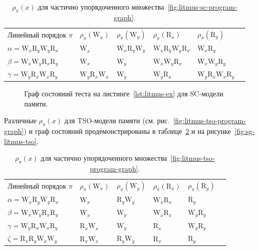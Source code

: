 \begin{table}[ht]
  \caption{$\rho_{\pi}(x)$ для частично упорядоченного
  множества~\ref{fig:litmus-sc-program-graph}.}
  \centering
  \begin{tabular}{llllll}
    Линейный порядок $\pi$ & $\rho_{\pi}(\text{W}_x)$ &
    $\rho_{\pi}(\text{W}_y)$ & $\rho_{\pi}(\text{R}_x)$ &
    $\rho_{\pi}(\text{R}_y)$ \\
    $\alpha = \text{W}_x \text{R}_y \text{W}_y \text{R}_x$ &
    $\text{W}_x$ & $\text{W}_x \text{R}_y \text{W}_y $ &
    $\text{W}_x \text{R}_y \text{W}_y \text{R}_x$ & $\text{W}_x
    \text{R}_y $ \\
    $\beta = \text{W}_x \text{W}_y \text{R}_x \text{R}_y$ &
    $\text{W}_x $ & $\text{W}_y$ & $\text{W}_x \text{W}_y
    \text{R}_x$ & $\text{W}_x \text{W}_y \text{R}_y$ \\
    $\gamma = \text{W}_y \text{R}_x \text{W}_x \text{R}_y$ &
    $\text{W}_y \text{R}_x \text{W}_x $ & $\text{W}_y $ &
    $\text{W}_y \text{R}_x $ & $\text{W}_y \text{R}_x \text{W}_x \text{R}_y$
  \end{tabular}
  \label{tab:litmus-sc-rho}
\end{table}

\begin{figure}[ht]
  \centerfloat{
    
  }
  \caption{Граф состояний теста на листинге~\ref{lst:litmus-ex} для
  SC-модели памяти.}
  \label{fig:sg-litmus-sc}
\end{figure}

Различные $\rho_{\pi}(x)$ для TSO-модели
памяти (см. рис.~\ref{fig:litmus-tso-program-graph}) и граф состояний
продемонстрированы в таблице~\ref{tab:litmus-tso-rho} и на
рисунке~\ref{fig:sg-litmus-tso}.

\begin{table}[ht]
  \caption{$\rho_{\pi}(x)$ для частично упорядоченного
  множества~\ref{fig:litmus-tso-program-graph}.}
  \centering
  \begin{tabular}{llllll}
    Линейный порядок $\pi$ & $\rho_{\pi}(\text{W}_x)$ &
    $\rho_{\pi}(\text{W}_y)$ & $\rho_{\pi}(\text{R}_x)$ &
    $\rho_{\pi}(\text{R}_y)$ \\
    $\alpha = \text{W}_x \text{R}_y \text{W}_y \text{R}_x$ &
    $\text{W}_x$ & $\text{R}_y \text{W}_y$ & $\text{W}_x
    \text{R}_x$ & $\text{R}_y $ \\
    $\beta = \text{W}_x \text{W}_y \text{R}_x \text{R}_y$ &
    $\text{W}_x $ & $\text{W}_y$ & $\text{W}_x \text{R}_x$ &
    $\text{W}_y \text{R}_y$ \\
    $\gamma = \text{W}_y \text{R}_x \text{W}_x \text{R}_y$ &
    $\text{R}_x \text{W}_x $ & $\text{W}_y $ & $\text{R}_x$ &
    $\text{W}_y \text{R}_y$ \\
    $\zeta = \text{R}_x \text{R}_y \text{W}_x \text{W}_y$ &
    $\text{R}_x \text{W}_x $ & $\text{R}_y \text{W}_y $ &
    $\text{R}_x$ & $\text{R}_y$
  \end{tabular}
  \label{tab:litmus-tso-rho}
\end{table}

